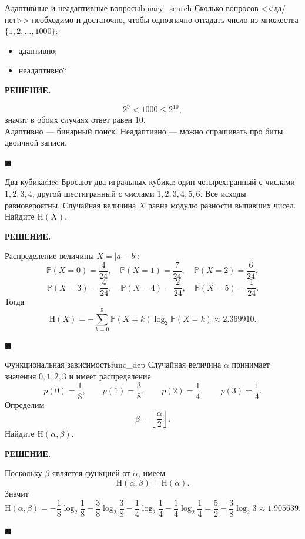 \documentclass[12pt,a4paper]{article}
\renewcommand{\le}{\leqslant}
\newcommand{\HH}{\mathrm{H}}
\newcommand{\PP}{\mathbb{P}}
\newenvironment{solution}{
    \begin{tcolorbox}[
        enhanced, breakable, blanker,
        borderline west={2.5pt}{0pt}{solgray},
        left=12pt, top=5pt, bottom=5pt,
        before skip=10pt, after skip=15pt
    ]
    \textbf{\textsf{РЕШЕНИЕ.}}\;
}{
    \hfill $\blacksquare$
    \end{tcolorbox}
}
\begin{document}
\begin{problem}{Адаптивные и неадаптивные вопросы}{binary_search}
Сколько вопросов <<да/нет>> необходимо и достаточно, чтобы однозначно отгадать число из множества $\{1,2,\dots,1000\}$:
\begin{itemize}[leftmargin=1.5em]
    \item адаптивно;
    \item неадаптивно?
\end{itemize}
\end{problem}
\begin{solution}
$$
2^9<1000\le 2^{10},
$$
значит в обоих случаях ответ равен $10$.\\
Адаптивно --- бинарный поиск. Неадаптивно --- можно спрашивать про биты двоичной записи.
\end{solution}

\begin{problem}{Два кубика}{dice}
Бросают два игральных кубика: один четырехгранный с числами $1,2,3,4$, другой шестигранный с числами $1,2,3,4,5,6$. Все исходы равновероятны. Случайная величина $X$ равна модулю разности выпавших чисел. Найдите $\HH(X)$.
\end{problem}
\begin{solution}
Распределение величины $X=|a-b|$:
$$
\PP(X=0)=\frac4{24},\quad
\PP(X=1)=\frac7{24},\quad
\PP(X=2)=\frac6{24},
$$
$$
\PP(X=3)=\frac4{24},\quad
\PP(X=4)=\frac2{24},\quad
\PP(X=5)=\frac1{24}.
$$
Тогда
$$
\HH(X)= -\sum_{k=0}^5 \PP(X=k)\log_2 \PP(X=k)\approx 2.369910.
$$
\end{solution}

\begin{problem}{Функциональная зависимость}{func_dep}
Случайная величина $\alpha$ принимает значения $0,1,2,3$ и имеет распределение
$$
p(0)=\frac18,\qquad p(1)=\frac38,\qquad p(2)=\frac14,\qquad p(3)=\frac14.
$$
Определим
$$
\beta=\left\lfloor \frac{\alpha}{2}\right\rfloor.
$$
Найдите $\HH(\alpha,\beta)$.
\end{problem}
\begin{solution}
Поскольку $\beta$ является функцией от $\alpha$, имеем
$$
\HH(\alpha,\beta)=\HH(\alpha).
$$
Значит
$$
\HH(\alpha,\beta)
=-\frac18\log_2\frac18-\frac38\log_2\frac38-\frac14\log_2\frac14-\frac14\log_2\frac14
=\frac52-\frac38\log_2 3
\approx 1.905639.
$$
\end{solution}
\end{document}
